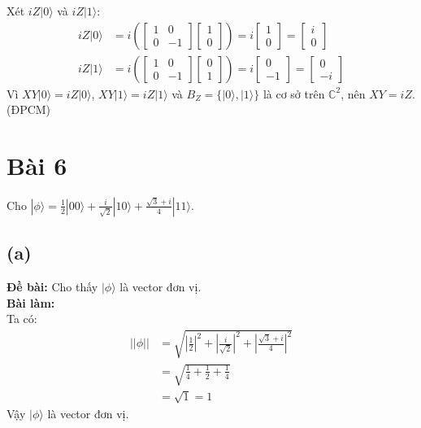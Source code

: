 Xét $iZ|0\rangle$ và $iZ|1\rangle$:
\begin{align*}
    iZ|0\rangle & = i\left(\begin{bmatrix}
                               1 & 0  \\
                               0 & -1
                           \end{bmatrix}
    \begin{bmatrix}
        1 \\
        0
    \end{bmatrix}\right)
    = i\begin{bmatrix}
           1 \\
           0
       \end{bmatrix}
    = \begin{bmatrix}
          i \\
          0
      \end{bmatrix}                      \\
    iZ|1\rangle & = i\left(\begin{bmatrix}
                               1 & 0  \\
                               0 & -1
                           \end{bmatrix}
    \begin{bmatrix}
        0 \\
        1
    \end{bmatrix}\right)
    = i\begin{bmatrix}
           0 \\
           -1
       \end{bmatrix}
    = \begin{bmatrix}
          0 \\
          -i
      \end{bmatrix}
\end{align*}
Vì $XY|0\rangle = iZ|0\rangle$, $XY|1\rangle = iZ|1\rangle$ và $B_Z = \{|0\rangle, |1\rangle\}$ là cơ sở trên $\mathbb{C}^2$, nên $XY = iZ$. (ĐPCM)

\section{Bài 6}
Cho $|\phi\rangle=\frac{1}{2}|00\rangle+\frac{i}{\sqrt{2}}|10\rangle+\frac{\sqrt{3}+i}{4}|11\rangle$.

\subsection{(a)}
\textbf{Đề bài:} Cho thấy $|\phi\rangle$ là vector đơn vị.\\
\textbf{Bài làm:}\\
Ta có:
\begin{align*}
    ||\phi|| & = \sqrt{\left|\frac{1}{2}\right|^2 + \left|\frac{i}{\sqrt{2}}\right|^2 + \left|\frac{\sqrt{3}+i}{4}\right|^2} \\
             & = \sqrt{\frac{1}{4} + \frac{1}{2} + \frac{1}{4}}                                                              \\
             & = \sqrt{1} = 1
\end{align*}
Vậy $|\phi\rangle$ là vector đơn vị.


